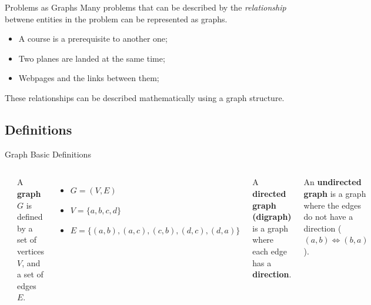 \begin{frame}[t]{Problems as Graphs}
  Many problems that can be described by the \emph{relationship} betwene entities in the problem can be represented as graphs.\bigskip

  \begin{itemize}
    \item A course is a prerequisite to another one;
    \item Two planes are landed at the same time;
    \item Webpages and the links between them;
  \end{itemize}\bigskip

  These relationships can be described mathematically using a graph structure.
\end{frame}

\subsection{Definitions}

\begin{frame}[t]{Graph Basic Definitions}

    \begin{columns}
      \begin{center}
        
      \end{center}

        A {\bf graph} $G$ is defined by a set of vertices $V$, and a set of edges $E$.\bigskip

        \begin{itemize}
          \item $G = (V,E)$
          \item $V = \{a,b,c,d\}$
          \item $E = \{(a,b), (a,c), (c,b), (d,c), (d,a)\}$
        \end{itemize}\bigskip

         A {\bf directed graph (digraph)} is a graph where each edge has a {\bf direction}.\medskip

         An {\bf undirected graph} is a graph where the edges do not have a direction ($(a,b) \iff (b,a)$).
    \end{columns}
\end{frame}

